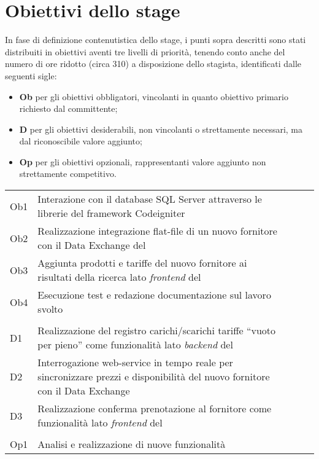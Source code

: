 \section{Obiettivi dello stage}
In fase di definizione contenutistica dello stage, i punti sopra descritti sono stati distribuiti in obiettivi aventi tre livelli di priorità, tenendo conto anche del numero di ore ridotto (circa 310) a disposizione dello stagista, identificati dalle seguenti sigle:
\begin{itemize}
	\item \textbf{Ob} per gli obiettivi obbligatori, vincolanti in quanto obiettivo primario richiesto dal committente;
	\item \textbf{D} per gli obiettivi desiderabili, non vincolanti o strettamente necessari, ma dal riconoscibile valore aggiunto;
	\item \textbf{Op} per gli obiettivi opzionali, rappresentanti valore aggiunto non strettamente competitivo.
\end{itemize}

\begin{longtable}{
		@{}
		>{\raggedright}p{.5cm}
		p{10.5cm}
		>{\raggedleft}p{0.2cm}@{}
		>{\raggedright}p{0.2cm}
		p{8.5cm}
		@{}} 
	\hline
	\multicolumn{2}{|c|}{\textbf{Obbligatori}}\\
	\hline
	Ob1 & Interazione con il database SQL Server attraverso le librerie del \gls{framework} Codeigniter\\
	\hline
	Ob2 & Realizzazione integrazione flat-file di un nuovo fornitore con il Data Exchange del \bookingEngine\\
	\hline
	Ob3 & Aggiunta prodotti e tariffe del nuovo fornitore ai risultati della ricerca lato \textit{frontend} del \bookingEngine\\
	\hline
	Ob4 & Esecuzione test e redazione documentazione sul lavoro svolto\\
	\hline
	\multicolumn{2}{|c|}{\textbf{Desiderabili}}\\
	\hline
	D1 & Realizzazione del registro carichi/scarichi tariffe “vuoto per pieno” come	funzionalità lato \textit{backend} del \bookingEngine\\
	\hline
	D2 & Interrogazione web-service in tempo reale per sincronizzare prezzi e disponibilità del nuovo fornitore con il Data Exchange\\
	\hline
	D3 & Realizzazione conferma prenotazione al fornitore come funzionalità lato \textit{frontend} del \bookingEngine\\
	\hline
	\multicolumn{2}{|c|}{\textbf{Opzionali}}\\
	\hline
	Op1 & Analisi e realizzazione di nuove funzionalità\\
	\hline
\end{longtable}

